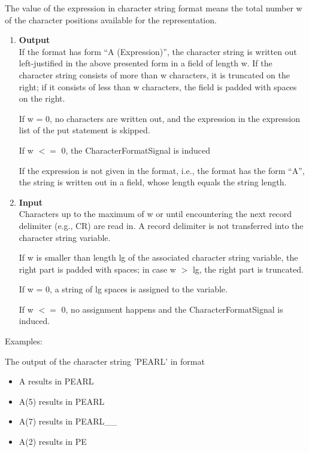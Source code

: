 The value of the expression in character string format means the total
number w of the character positions available for the representation.
\begin{enumerate}
\item {\bf Output}\\
If the format has form ``A (Expression)'', the character string is
written out left-justified in the above presented form in a field of
length w. If the character string consists of more than w characters, it
is truncated on the right; if it consists of less than w characters, the
field is padded with spaces on the right. 
\begin{removed}
If w = 0, no characters are
written out, and the expression in the expression list of the put
statement is skipped.
\end{removed}
\begin{accepted}
If w $<=$ 0, the CharacterFormatSignal is induced
\end{accepted}

If the expression is not given in the format, i.e., the format has the
form ``A'', the string is written out in a field, whose length equals
the string length.
\item {\bf Input}\\
Characters up to the maximum of w or until encountering the next record
delimiter (e.g., CR) are read in. A record delimiter is not transferred
into the character string variable.

If w is smaller than length lg of the associated character string
variable, the right part is padded with spaces; in case w $>$ lg, the
right part is truncated.
\begin{removed}
 If w = 0, a string of lg spaces is assigned to
the variable.
\end{removed}
\begin{accepted}
 If w $<=$ 0, no assignment happens and the CharacterFormatSignal is 
   induced. 
\end{accepted}
\end{enumerate}

Examples:

The output of the character string 'PEARL' in format

\begin{itemize}
\item A    results in PEARL 
\item A(5) results in PEARL 
\item A(7) results in PEARL\_\_ 
\item A(2) results in PE
\end{itemize}

